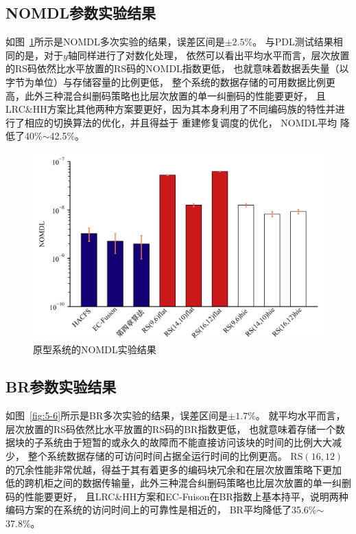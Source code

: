 \subsection{NOMDL参数实验结果}
如图~\ref{fig:5-5}所示是NOMDL多次实验的结果，误差区间是$\pm 2.5\%$。
与PDL测试结果相同的是，对于$y$轴同样进行了对数化处理，
依然可以看出平均水平而言，层次放置的RS码依然比水平放置的RS码的NOMDL指数更低，
也就意味着数据丢失量（以字节为单位）与存储容量的比例更低，
整个系统的数据存储的可用数据比例更高，此外三种混合纠删码策略也比层次放置的单一纠删码的性能要更好，
且LRC\&HH方案比其他两种方案要更好，因为其本身利用了不同编码族的特性并进行了相应的切换算法的优化，并且得益于
重建修复调度的优化，
NOMDL平均
降低了40\%$\sim$42.5\%。 


\begin{figure}[htbp]
	\centering
	\includegraphics [scale=0.06]{figures/5-5.jpg}
	\caption{原型系统的NOMDL实验结果}
	\label{fig:5-5}
\end{figure}

\subsection{BR参数实验结果}

如图~\ref{fig:5-6}所示是BR多次实验的结果，误差区间是$\pm 1.7\%$。 
就平均水平而言，层次放置的RS码依然比水平放置的RS码的BR指数更低，
也就意味着存储一个数据块的子系统由于短暂的或永久的故障而不能直接访问该块的时间的比例大大减少，
整个系统数据存储的可访问时间占据全运行时间的比例更高。
RS$(16,12)$的冗余性能非常优越，得益于其有着更多的编码块冗余和在层次放置策略下更加
低的跨机柜之间的数据传输量，此外三种混合纠删码策略也比层次放置的单一纠删码的性能要更好，
且LRC\&HH方案和EC-Fuison在BR指数上基本持平，说明两种编码方案的在系统的访问时间上的可靠性是相近的，
BR平均降低了35.6\%$\sim$37.8\%。

